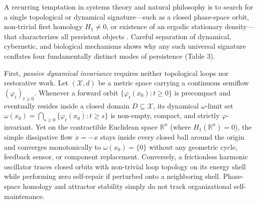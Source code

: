 \documentclass[11pt,a4paper]{article}
\begin{document}
A recurring temptation in systems theory and natural philosophy is to
search for a single topological or dynamical signature---such as a
closed phase-space orbit, non-trivial first homology \(H_1 \neq 0\), or
existence of an ergodic stationary density---that characterizes all
persistent objects \citep{friston2013}. Careful separation of dynamical,
cybernetic, and biological mechanisms shows why any such universal
signature conflates four fundamentally distinct modes of persistence
(Table 3).

First, \emph{passive dynamical invariance} requires neither topological
loops nor restorative work. Let \((\mathcal{X}, d)\) be a metric space
carrying a continuous semiflow \((\varphi_t)_{t \ge 0}\). Whenever a
forward orbit \(\{\varphi_t(x_0) : t \ge 0\}\) is precompact and
eventually resides inside a closed domain \(D \subseteq \mathcal{X}\),
its dynamical \(\omega\)-limit set
\(\omega(x_0) = \bigcap_{s \ge 0} \overline{\{\varphi_t(x_0) : t \ge s\}}\)
is non-empty, compact, and strictly \(\varphi\)-invariant. Yet on the
contractible Euclidean space \(\mathbb{R}^n\) (where
\(H_1(\mathbb{R}^n) = 0\)), the simple dissipative flow \(\dot{x} = -x\)
stays inside every closed ball around the origin and converges
monotonically to \(\omega(x_0) = \{0\}\) without any geometric cycle,
feedback sensor, or component replacement. Conversely, a frictionless
harmonic oscillator traces closed orbits with non-trivial loop topology
on its energy shell while performing zero self-repair if perturbed onto
a neighboring shell. Phase-space homology and attractor stability simply
do not track organizational self-maintenance.

\end{document}
